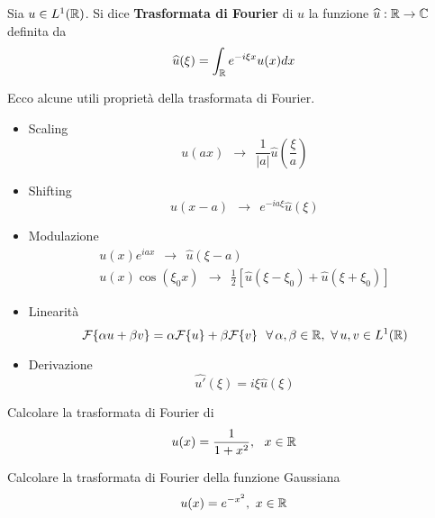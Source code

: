 \ParteEsercizi

\begin{defn}
Sia $u\in L^{1}(\mathbb{R})$. Si dice \textbf{Trasformata di Fourier} di $u$ la funzione $\widehat{u} :\mathbb{R} \rightarrow \mathbb{C} $ definita da
\begin{equation*}
\widehat{u}(\xi) = \int_{\mathbb{R}} e^{- i\xi x} u(x) dx
\end{equation*}
\end{defn}
\begin{thm}
[Proprietà] Ecco alcune utili proprietà della trasformata di Fourier.
\begin{itemize}
\item Scaling
\begin{equation*}
u(ax) \ \ \rightarrow \ \ \frac{1}{| a|}\hat{u}\left(\frac{\xi}{a}\right)
\end{equation*}
\item Shifting
\begin{equation*}
u(x - a) \ \ \rightarrow \ \ e^{- ia\xi}\hat{u}(\xi)
\end{equation*}
\item Modulazione
\begin{gather*}
u(x) e^{iax} \ \ \rightarrow \ \ \hat{u}(\xi - a)\\
u(x)\cos(\xi_{0} x) \ \ \rightarrow \ \ \frac{1}{2}[\hat{u}(\xi - \xi_{0}) + \hat{u}(\xi + \xi_{0})]
\end{gather*}
\item Linearità
\begin{equation*}
\Fc \{\alpha u + \beta v\} = \alpha \Fc \{u\} + \beta \Fc \{v\} \ \ \forall \alpha, \beta \in \RR, \ \forall u, v\in L^{1}(\RR)
\end{equation*}
\item Derivazione
\begin{equation*}
\widehat{u'}(\xi) = i\xi \hat{u}(\xi)
\end{equation*}
\end{itemize}
\end{thm}


Calcolare la trasformata di Fourier di
\begin{equation*}
u(x) = \frac{1}{1 + x^{2}}, \ \ x\in \mathbb{R}
\end{equation*}


Calcolare la trasformata di Fourier della funzione Gaussiana
\begin{equation*}
u(x) = e^{- x^{2}}, \ x\in \mathbb{R}
\end{equation*}

